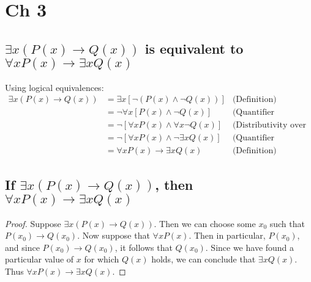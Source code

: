 \documentclass{report}
\theoremstyle{definition}
\begin{document}
\section{Ch 3}
\subsection{$\exists x(P(x)\to Q(x))$ is equivalent to $\forall xP(x)\to\exists xQ(x)$}
Using logical equivalences:
\begin{align*}
\exists x(P(x)\to Q(x))&=\exists x[\neg(P(x)\land\neg Q(x))]&\text{(Definition)}\\
&=\neg\forall x[P(x)\land\neg Q(x)]&\text{(Quantifier negation)}\\
&=\neg[\forall xP(x)\land\forall x\neg Q(x)]&\text{(Distributivity over conjuction)}\\
&=\neg[\forall xP(x)\land\neg\exists xQ(x)]&\text{(Quantifier negation)}\\
&=\forall xP(x)\to\exists xQ(x)&\text{(Definition)}
\end{align*}

\subsection{If $\exists x(P(x)\to Q(x))$, then $\forall xP(x)\to\exists xQ(x)$}
\begin{proof}
Suppose $\exists x(P(x)\to Q(x))$. Then we can choose some $x_0$ such that $P(x_0)\to Q(x_0)$. Now suppose that $\forall xP(x)$.
Then in particular, $P(x_0)$, and since $P(x_0)\to Q(x_0)$, it follows that $Q(x_0)$. Since we have found a particular 
value of $x$ for which $Q(x)$ holds, we can conclude that $\exists xQ(x)$. Thus $\forall xP(x)\to\exists xQ(x)$.
\end{proof}
\newpage

\subsection{}
\end{document}
